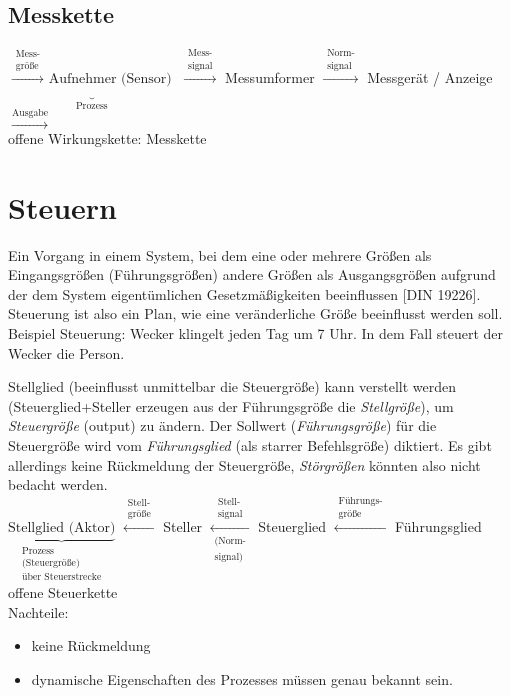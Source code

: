 \documentclass{scrreprt}
\begin{document}
\subsection{Messkette}
$\underbrace{\overset{\substack{\text{Mess-}\\\text{größe}}}{\longrightarrow} \text{ Aufnehmer (Sensor)}}_{\text{Prozess}}$ 
$\overset{\substack{\text{Mess-}\\\text{signal}}}{\longrightarrow}$ Messumformer 
$\overset{\substack{\text{Norm-}\\\text{signal}}}{\longrightarrow}$ Messgerät / Anzeige 
$\overset{\text{Ausgabe}}{\longrightarrow}$\\
offene Wirkungskette: Messkette

\section{Steuern}
Ein Vorgang in einem System, bei dem eine oder mehrere Größen als Eingangsgrößen (Führungsgrößen) andere Größen als Ausgangsgrößen aufgrund der dem System eigentümlichen Gesetzmäßigkeiten beeinflussen [DIN 19226].\\
Steuerung ist also ein Plan, wie eine veränderliche Größe beeinflusst werden soll.\\
Beispiel Steuerung: Wecker klingelt jeden Tag um 7 Uhr. In dem Fall steuert der Wecker die Person.\medskip

Stellglied (beeinflusst unmittelbar die Steuergröße) kann verstellt werden (Steuerglied+Steller erzeugen aus der Führungsgröße die \emph{Stellgröße}), um \emph{Steuergröße} (output) zu ändern. Der Sollwert (\emph{Führungsgröße}) für die Steuergröße wird vom \emph{Führungsglied} (als starrer Befehlsgröße) diktiert. Es gibt allerdings keine Rückmeldung der Steuergröße, \emph{Störgrößen} könnten also nicht bedacht werden.\\
$\underbrace{\text{Stellglied (Aktor)}}_{\substack{\text{Prozess}\\\text{(Steuergröße)}\\\text{über Steuerstrecke}}}$
$\overset{\substack{\text{Stell-}\\\text{größe}}}{\longleftarrow}$ Steller
$\underset{\substack{\text{(Norm-}\\\text{signal)}}}{\overset{\substack{\text{Stell-}\\\text{signal}}}{\longleftarrow}}$ Steuerglied 
$\overset{\substack{\text{Führungs-}\\\text{größe}}}{\longleftarrow}$ Führungsglied\\
offene Steuerkette\\
Nachteile:
\begin{itemize}
\item keine Rückmeldung
\item dynamische Eigenschaften des Prozesses müssen genau bekannt sein.
\end{itemize}
\end{document}
